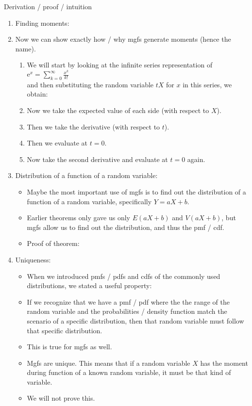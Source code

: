 \documentclass{article}
\newcommand{\e}{\mathrm{e}}		%
\begin{document}
Derivation / proof / intuition\bigskip
\begin{enumerate}[(1)]
    \item Finding moments:
    \item[] Now we can show exactly how / why mgfs generate moments (hence the name).
    \begin{enumerate}
        \item We will start by looking at the infinite series representation of $\e^x = \displaystyle \sum_{k = 0}^{\infty} \frac{x^k}{k!}$ \\and then substituting the random variable $tX$ for $x$ in this series, we obtain:\vspace{30pt}
        \item Now we take the expected value of each side (with respect to $X$).\vspace{60pt}
        \item Then we take the derivative (with respect to $t$).\vspace{60pt}
        \item Then we evaluate at $t = 0$.\vspace{60pt}
        \item Now take the second derivative and evaluate at $t = 0$ again.\vspace{100pt}
    \end{enumerate}
    \item Distribution of a function of a random variable:\bigskip
    \begin{itemize}
        \item Maybe the most important use of mgfs is to find out the distribution of a function of a random variable, specifically $Y = aX + b$.
        \item Earlier theorems only gave us only $E(aX + b)$ and $V(aX + b)$, but mgfs allow us to find out the distribution, and thus the pmf / cdf.\bigskip
        \item Proof of theorem:\vspace{100pt}
    \end{itemize}\bigskip
    \item Uniqueness:
    \begin{itemize}
        \item When we introduced pmfs / pdfs and cdfs of the commonly used distributions, we stated a useful property:
        \item[] If we recognize that we have a pmf / pdf where the the range of the random variable and the probabilities / density function match the scenario of a specific distribution, then that random variable must follow that specific distribution.
        \item This is true for mgfs as well.
        \item[] Mgfs are unique. This means that if a random variable $X$ has the moment during function of a known random variable, it must be that kind of variable.
        \item We will not prove this.
    \end{itemize}
\end{enumerate}\bigskip
\end{document}
